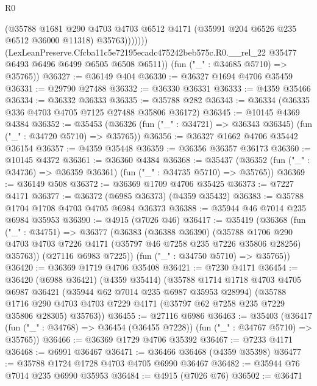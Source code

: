 \begin{lexlean}{R0}
\begin{coremodule}
                    (@35788
                      @1681
                      @290
                      @4703
                      @4703
                      @6512
                      @4171
                      (@35991 @204 @6526 @235 @6512 @36000 @11318)
                      @35763)))))))
        (LexLeanPreserve.Cfcba11c5e72195ecadc475242beb575c.R0.__rel_22
          @35477
          @6493
          @6496
          @6499
          @6505
          @6508
          @6511))
      (fun ("_" : @34685 @5710) => @35765))
@36327 := @36149 @404
@36330 := @36327 @1694 @4706 @35459
@36331 := @29790 @27488
@36332 := @36330 @36331
@36333 := @4359 @35466
@36334 := @36332 @36333
@36335 := @35788 @282
@36343 := @36334 (@36335 @336 @4703 @4705 @7125 @27488 @35806 @36172)
@36345 := @10145 @4369 @4384
@36352 := @35453 (@36326 (fun ("_" : @34721) => @36343 @36345) (fun ("_" : @34720 @5710) => @35765))
@36356 := @36327 @1662 @4706 @35442 @36154
@36357 := @4359 @35448
@36359 := @36356 @36357 @36173
@36360 := @10145 @4372
@36361 := @36360 @4384
@36368 := @35437 (@36352 (fun ("_" : @34736) => @36359 @36361) (fun ("_" : @34735 @5710) => @35765))
@36369 := @36149 @508
@36372 := @36369 @1709 @4706 @35425
@36373 := @7227 @4171
@36377 := @36372 (@6985 @36373) (@4359 @35432)
@36383 := @35788 @1704 @1708 @4703 @4705 @6984 @36373
@36388 := @35944 @46 @7014 @235 @6984 @35953
@36390 := @4915 (@7026 @46)
@36417 := @35419
    (@36368
      (fun ("_" : @34751) =>
      @36377
        (@36383
          (@36388 @36390)
          (@35788
            @1706
            @290
            @4703
            @4703
            @7226
            @4171
            (@35797 @46 @7258 @235 @7226 @35806 @28256)
            @35763))
        (@27116 @6983 @7225))
      (fun ("_" : @34750 @5710) => @35765))
@36420 := @36369 @1719 @4706 @35408
@36421 := @7230 @4171
@36454 := @36420
    (@6988 @36421)
    (@4359 @35414)
    (@35788
      @1714
      @1718
      @4703
      @4705
      @6987
      @36421
      (@35944 @62 @7014 @235 @6987 @35953 @28994)
      (@35788
        @1716
        @290
        @4703
        @4703
        @7229
        @4171
        (@35797 @62 @7258 @235 @7229 @35806 @28305)
        @35763))
@36455 := @27116 @6986
@36463 := @35403
    (@36417 (fun ("_" : @34768) => @36454 (@36455 @7228)) (fun ("_" : @34767 @5710) => @35765))
@36466 := @36369 @1729 @4706 @35392
@36467 := @7233 @4171
@36468 := @6991 @36467
@36471 := @36466 @36468 (@4359 @35398)
@36477 := @35788 @1724 @1728 @4703 @4705 @6990 @36467
@36482 := @35944 @76 @7014 @235 @6990 @35953
@36484 := @4915 (@7026 @76)
@36502 := @36471

\end{coremodule}
\end{lexlean}
